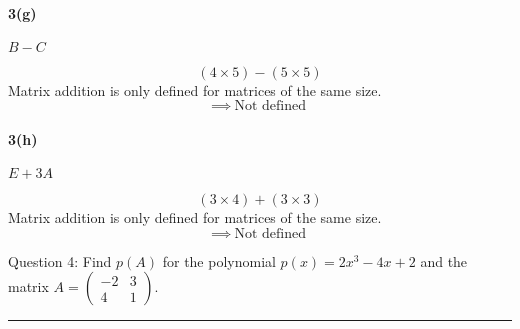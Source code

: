 \documentclass[a4paper,11pt,twoside]{report}
\begin{document}
\paragraph{3(g)} $B-C$

\[(4\times 5)-(5\times 5)\]
Matrix addition is only defined for matrices of the same size. \[\implies\boxed{\:\text{Not defined}\:}\]

\paragraph{3(h)} $E+3A$

\[(3\times 4) + (3\times 3)\]
Matrix addition is only defined for matrices of the same size. \[\implies\boxed{\:\text{Not defined}\:}\]

\noindent Question 4: Find $p(A)$ for the polynomial $p(x) = 2x^{3}-4x+2$ and the matrix $A = \begin{pmatrix} -2 & 3 \\ 4 & 1 \end{pmatrix} $. \\ \hrule
\end{document}

